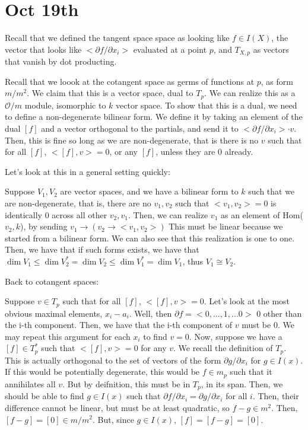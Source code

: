 \documentclass[10pt]{article}
\begin{document}
\section{Oct 19th}

Recall that we defined the tangent space space as looking like $f \in I(X)$, the vector that looks like $<\partial f/\partial x_i>$ evaluated at a point $p$, and $T_{X,p}$ as vectors that vanish by dot producting.

Recall that we loook at the cotangent space as germs of functions at $p$, as form $m/m^2$. We claim that this is a vector space, dual to $T_p$. We can realize this as a $\mathcal{O}/m$ module, isomorphic to $k$ vector space. To show that this is a dual, we need to define a non-degenerate bilinear form. We define it by taking an element of the dual $[f]$ and a vector orthogonal to the partials, and send it to $<\partial f / \partial x_i> \cdot v$. Then, this is fine so long as we are non-degenerate, that is there is no $v$ such that for all $[f]$, $<[f],v> = 0$, or any $[f]$, unless they are $0$ already.

Let’s look at this in a general setting quickly:

Suppose $V_1,V_2$ are vector spaces, and we have a bilinear form to $k$ such that we are non-degenerate, that is, there are no $v_1, v_2$ such that $<v_1,v_2> = 0$ is identically 0 across all other $v_2, v_1$. Then, we can realize $v_1$ as an element of Hom($v_2,k$), by sending $v_1 \to (v_2 \to <v_1,v_2>)$ This must be linear because we started from a bilinear form. We can also see that this realization is one to one. Then, we have that if such forms exists, we have that $\dim V_1 \leq \dim V_2^*  = \dim V_2 \leq \dim V_1^* = \dim V_1$, thus $V_1 \cong V_2$. 

Back to cotangent spaces:

Suppose $v \in T_p$ such that for all $[f]$, $<[f],v> = 0$. Let’s look at the most obvious maximal elements, $x_i - a_i$. Well, then $\partial f = < 0,...,1,...0 >$ 0 other than the i-th component. Then, we have that the i-th component of $v$ must be $0$. We may repeat this argument for each $x_i$ to find $v = 0$. Now, suppose we have a $[f] \in T_p^*$ such that $<[f],v> = 0$ for any $v$. We recall the definition of $T_p$. This is actually orthogonal to the set of vectors of the form $\partial g/ \partial x_i$ for $g \in I(x)$. If this would be potentially degenerate, this would be $f \in m_p$ such that it annihilates all $v$. But by deifnition, this must be in $T_p$, in its span. Then, we should be able to find $g \in I(x)$ such that $\partial f / \partial x_i = \partial g /\partial x_i$ for all $i$. Then, their difference cannot be linear, but must be at least quadratic, so $f - g \in m^2$. Then, $[f - g] = [0] \in m / m^2$. But, since $g \in I(x)$, $[f] = [f-g] = [0]$.
\end{document}
